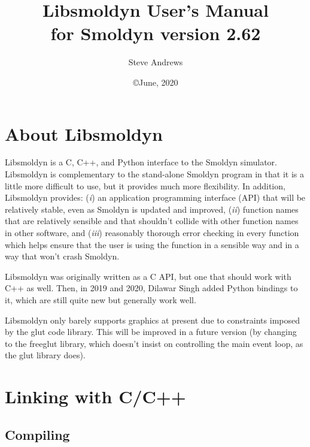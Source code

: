 \documentclass {book}
\begin{document}



\title{\textbf{Libsmoldyn User's Manual} \\ \large for Smoldyn version 2.62}
\date{\copyright June, 2020}
\author{Steve Andrews}
\maketitle

\tableofcontents


\chapter{About Libsmoldyn}
Libsmoldyn is a C, C++, and Python interface to the Smoldyn simulator. Libsmoldyn is complementary to the stand-alone Smoldyn program in that it is a little more difficult to use, but it provides much more flexibility. In addition, Libsmoldyn provides: (\emph{i}) an application programming interface (API) that will be relatively stable, even as Smoldyn is updated and improved, (\emph{ii}) function names that are relatively sensible and that shouldn't collide with other function names in other software, and (\emph{iii}) reasonably thorough error checking in every function which helps ensure that the user is using the function in a sensible way and in a way that won't crash Smoldyn.

Libsmoldyn was originally written as a C API, but one that should work with C++ as well. Then, in 2019 and 2020, Dilawar Singh added Python bindings to it, which are still quite new but generally work well.

Libsmoldyn only barely supports graphics at present due to constraints imposed by the glut code library. This will be improved in a future version (by changing to the freeglut library, which doesn't insist on controlling the main event loop, as the glut library does).


\chapter{Linking with C/C++}

\section{Compiling}
\end{document}
